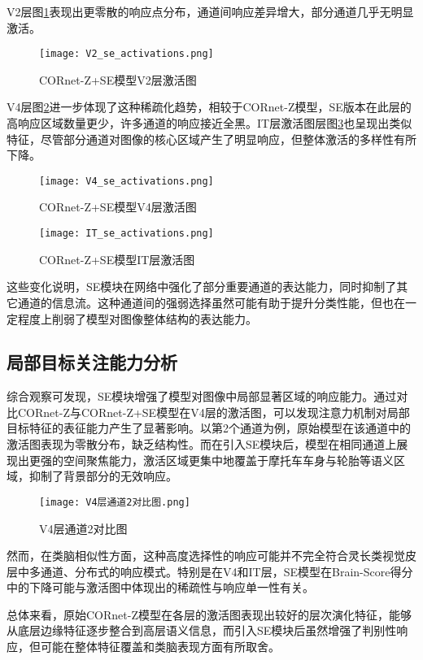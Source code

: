 V2层图\ref{f.v2_se_act}表现出更零散的响应点分布，通道间响应差异增大，部分通道几乎无明显激活。

\begin{figure}[hbt]
	\centering
	\texttt{[image: V2\_se\_activations.png]}
	\caption{CORnet-Z+SE模型V2层激活图}
	\label{f.v2_se_act}
\end{figure}

V4层图\ref{f.v4_se_act}进一步体现了这种稀疏化趋势，相较于CORnet-Z模型，SE版本在此层的高响应区域数量更少，许多通道的响应接近全黑。IT层激活图层图\ref{f.it_se_act}也呈现出类似特征，尽管部分通道对图像的核心区域产生了明显响应，但整体激活的多样性有所下降。

\begin{figure}[hbt]
	\centering
	\texttt{[image: V4\_se\_activations.png]}
	\caption{CORnet-Z+SE模型V4层激活图}
	\label{f.v4_se_act}
\end{figure}

\begin{figure}[hbt]
	\centering
	\texttt{[image: IT\_se\_activations.png]}
	\caption{CORnet-Z+SE模型IT层激活图}
	\label{f.it_se_act}
\end{figure}

这些变化说明，SE模块在网络中强化了部分重要通道的表达能力，同时抑制了其它通道的信息流。这种通道间的强弱选择虽然可能有助于提升分类性能，但也在一定程度上削弱了模型对图像整体结构的表达能力。

\subsection{局部目标关注能力分析}

综合观察可发现，SE模块增强了模型对图像中局部显著区域的响应能力。通过对比CORnet-Z与CORnet-Z+SE模型在V4层的激活图，可以发现注意力机制对局部目标特征的表征能力产生了显著影响。以第2个通道为例，原始模型在该通道中的激活图表现为零散分布，缺乏结构性。而在引入SE模块后，模型在相同通道上展现出更强的空间聚焦能力，激活区域更集中地覆盖于摩托车车身与轮胎等语义区域，抑制了背景部分的无效响应。

\begin{figure}[hbt]
	\centering
	\texttt{[image: V4层通道2对比图.png]}
	\caption{V4层通道2对比图}
	\label{f.v4_2_act}
\end{figure}

然而，在类脑相似性方面，这种高度选择性的响应可能并不完全符合灵长类视觉皮层中多通道、分布式的响应模式。特别是在V4和IT层，SE模型在Brain-Score得分中的下降可能与激活图中体现出的稀疏性与响应单一性有关。

总体来看，原始CORnet-Z模型在各层的激活图表现出较好的层次演化特征，能够从底层边缘特征逐步整合到高层语义信息，而引入SE模块后虽然增强了判别性响应，但可能在整体特征覆盖和类脑表现方面有所取舍。
